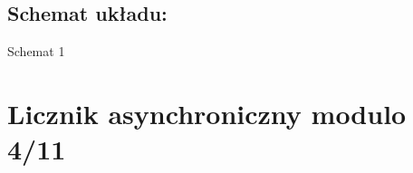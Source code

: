 \documentclass[12pt,a4paper]{article}
\begin{document}
		\subsection{Schemat układu:}
		
			\vspace{1.5cm}
			\begin{center}
				Schemat 1
			\end{center}
	
	\section{Licznik asynchroniczny modulo 4/11}
		
\end{document}
